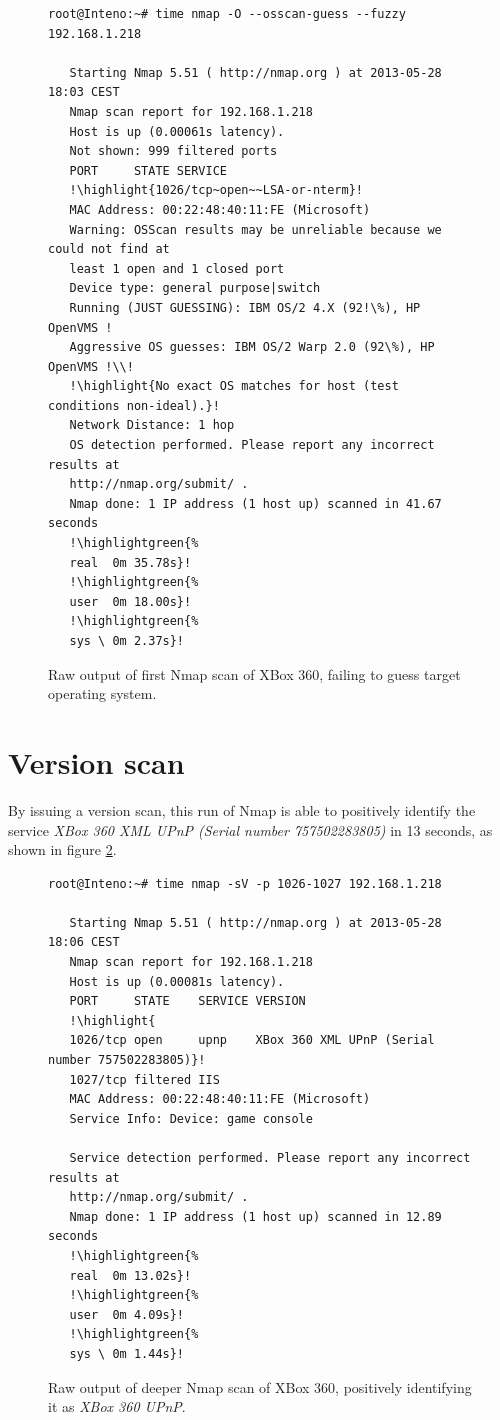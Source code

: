 \documentclass[a4paper,11pt,makeidx]{kth-bcs}
\newcommand{\reducedstrut}{\vrule width 0pt height .9\ht\strutbox depth .9\dp\strutbox\relax}
\newcommand{\highlight}[1]{%
  \begingroup
  \colorbox{light-gray!20}{\footnotesize\ttfamily#1\/}%
  \endgroup
}
\newcommand{\highlightgreen}[1]{%
  \begingroup
  \colorbox{light-green!20}{#1\/}%
  \endgroup
}
\begin{document}
\begin{figure}[h!]
   \centering
   \begin{lstlisting}[escapechar=!]
   root@Inteno:~# time nmap -O --osscan-guess --fuzzy 192.168.1.218

   Starting Nmap 5.51 ( http://nmap.org ) at 2013-05-28 18:03 CEST
   Nmap scan report for 192.168.1.218
   Host is up (0.00061s latency).
   Not shown: 999 filtered ports
   PORT     STATE SERVICE
   !\highlight{1026/tcp~open~~LSA-or-nterm}!
   MAC Address: 00:22:48:40:11:FE (Microsoft)
   Warning: OSScan results may be unreliable because we could not find at
   least 1 open and 1 closed port
   Device type: general purpose|switch
   Running (JUST GUESSING): IBM OS/2 4.X (92!\%), HP OpenVMS !
   Aggressive OS guesses: IBM OS/2 Warp 2.0 (92\%), HP OpenVMS !\\!
   !\highlight{No exact OS matches for host (test conditions non-ideal).}!
   Network Distance: 1 hop
   OS detection performed. Please report any incorrect results at
   http://nmap.org/submit/ .
   Nmap done: 1 IP address (1 host up) scanned in 41.67 seconds
   !\highlightgreen{%
   real  0m 35.78s}!
   !\highlightgreen{%
   user  0m 18.00s}!
   !\highlightgreen{%
   sys \ 0m 2.37s}!
   \end{lstlisting}
   \caption{
      \small{
         Raw output of first Nmap scan of XBox 360, failing to guess target operating system.
      }
   }
   \label{fig:nmapos}
\end{figure}

\newpage
\section{Version scan}
By issuing a version scan, this run of Nmap is able to positively identify the service \emph{XBox 360 XML UPnP (Serial number 757502283805)} in 13 seconds, as shown in figure \ref{fig:nmapxbox}.
\begin{figure}[h!]
   \centering
   \begin{lstlisting}[escapechar=!]
   root@Inteno:~# time nmap -sV -p 1026-1027 192.168.1.218

   Starting Nmap 5.51 ( http://nmap.org ) at 2013-05-28 18:06 CEST
   Nmap scan report for 192.168.1.218
   Host is up (0.00081s latency).
   PORT     STATE    SERVICE VERSION
   !\highlight{
   1026/tcp open     upnp    XBox 360 XML UPnP (Serial number 757502283805)}!
   1027/tcp filtered IIS
   MAC Address: 00:22:48:40:11:FE (Microsoft)
   Service Info: Device: game console

   Service detection performed. Please report any incorrect results at
   http://nmap.org/submit/ .
   Nmap done: 1 IP address (1 host up) scanned in 12.89 seconds
   !\highlightgreen{%
   real  0m 13.02s}!
   !\highlightgreen{%
   user  0m 4.09s}!
   !\highlightgreen{%
   sys \ 0m 1.44s}!
   \end{lstlisting}
   \caption{
      \small{
         Raw output of deeper Nmap scan of XBox 360, positively identifying it as \emph{XBox 360 UPnP}.
      }
   }
   \label{fig:nmapxbox}
\end{figure}
\end{document}
